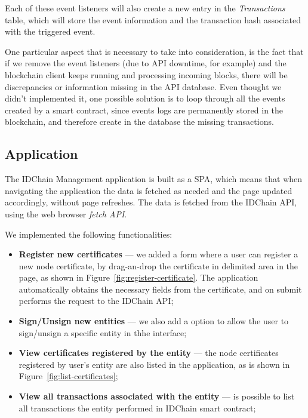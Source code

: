 Each of these event listeners will also create a new entry in the \textit{Transactions} table, which will store the event information and the transaction hash associated with the triggered event.

One particular aspect that is necessary to take into consideration, is the fact that if we remove the event listeners (due to API downtime, for example) and the blockchain client keeps running and processing incoming blocks, there will be discrepancies or information missing in the API database.
Even thought we didn't implemented it, one possible solution is to loop through all the events created by a smart contract, since events logs are permanently stored in the blockchain, and therefore create in the database the missing transactions.

\subsection{Application}\label{subsection:mapp}

The IDChain Management application is built as a \ac{SPA}, which means that when navigating the application the data is fetched as needed and the page updated accordingly, without page refreshes.
The data is fetched from the IDChain API, using the web browser \textit{fetch API}.

We implemented the following functionalities:
\begin{itemize}
  \item \textbf{Register new certificates} — we added a form where a user can register a new node certificate, by drag-an-drop the certificate in delimited area in the page, as shown in Figure~\ref{fig:register-certificate}. The application automatically obtains the necessary fields from the certificate, and on submit performs the request to the IDChain API;
  \item \textbf{Sign/Unsign new entities} — we also add a option to allow the user to sign/unsign a specific entity in thhe interface;
  \item \textbf{View certificates registered by the entity} — the node certificates registered by user's entity are also listed in the application, as is shown in Figure~\ref{fig:list-certificates};
  \item \textbf{View all transactions associated with the entity} — is possible to list all transactions the entity performed in IDChain smart contract;
\end{itemize}

